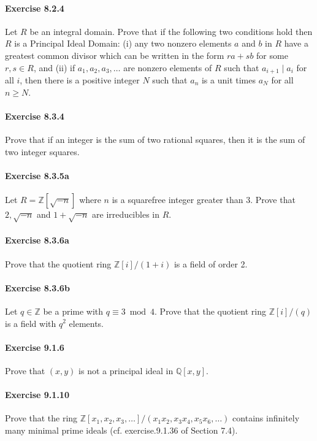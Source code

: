 \documentclass{article}
\theoremstyle{definition}
\begin{document}
\paragraph{Exercise 8.2.4} Let $R$ be an integral domain. Prove that if the following two conditions hold then $R$ is a Principal Ideal Domain: (i) any two nonzero elements $a$ and $b$ in $R$ have a greatest common divisor which can be written in the form $r a+s b$ for some $r, s \in R$, and (ii) if $a_{1}, a_{2}, a_{3}, \ldots$ are nonzero elements of $R$ such that $a_{i+1} \mid a_{i}$ for all $i$, then there is a positive integer $N$ such that $a_{n}$ is a unit times $a_{N}$ for all $n \geq N$.

\paragraph{Exercise 8.3.4} Prove that if an integer is the sum of two rational squares, then it is the sum of two integer squares.

\paragraph{Exercise 8.3.5a} Let $R=\mathbb{Z}[\sqrt{-n}]$ where $n$ is a squarefree integer greater than 3. Prove that $2, \sqrt{-n}$ and $1+\sqrt{-n}$ are irreducibles in $R$.

\paragraph{Exercise 8.3.6a} Prove that the quotient ring $\mathbb{Z}[i] /(1+i)$ is a field of order 2.

\paragraph{Exercise 8.3.6b} Let $q \in \mathbb{Z}$ be a prime with $q \equiv 3 \bmod 4$. Prove that the quotient ring $\mathbb{Z}[i] /(q)$ is a field with $q^{2}$ elements.

\paragraph{Exercise 9.1.6} Prove that $(x, y)$ is not a principal ideal in $\mathbb{Q}[x, y]$.

\paragraph{Exercise 9.1.10} Prove that the ring $\mathbb{Z}\left[x_{1}, x_{2}, x_{3}, \ldots\right] /\left(x_{1} x_{2}, x_{3} x_{4}, x_{5} x_{6}, \ldots\right)$ contains infinitely many minimal prime ideals (cf. exercise.9.1.36 of Section 7.4).
\end{document}
